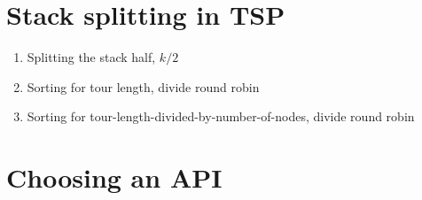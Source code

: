 \documentclass[a4paper,11pt,twoside]{article}
\begin{document}
\section{Stack splitting in TSP}
\begin{enumerate}[label={\alph*)}]
\item Splitting the stack half, $k/2$
\item Sorting for tour length, divide round robin
\item Sorting for tour-length-divided-by-number-of-nodes, divide round robin
\end{enumerate}



\section{Choosing an API}




\end{document}
